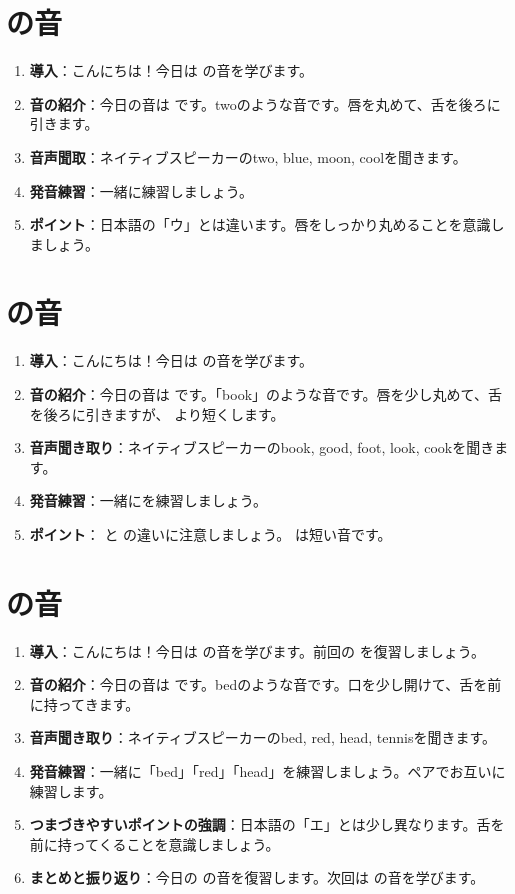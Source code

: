 \documentclass[book,jafontscale=0.9247]{jlreq}
\begin{document}
\section{ の音}
\begin{enumerate}
    \item \textbf{導入}：こんにちは！今日は  の音を学びます。
    \item \textbf{音の紹介}：今日の音は  です。twoのような音です。唇を丸めて、舌を後ろに引きます。
    \item \textbf{音声聞取}：ネイティブスピーカーのtwo, blue, moon, coolを聞きます。
    \item \textbf{発音練習}：一緒に練習しましょう。
    \item \textbf{ポイント}：日本語の「ウ」とは違います。唇をしっかり丸めることを意識しましょう。
\end{enumerate}
\section{\textipa{/\textupsilon /} の音}
\begin{enumerate}
    \item \textbf{導入}：こんにちは！今日は  の音を学びます。
    \item \textbf{音の紹介}：今日の音は \textipa{/\textupsilon /} です。「book」のような音です。唇を少し丸めて、舌を後ろに引きますが、 より短くします。
    \item \textbf{音声聞き取り}：ネイティブスピーカーのbook, good, foot, look, cookを聞きます。
    \item \textbf{発音練習}：一緒にを練習しましょう。
    \item \textbf{ポイント}： と \textipa{/\textupsilon/} の違いに注意しましょう。  は短い音です。
\end{enumerate}
\section{ の音}
\begin{enumerate}
    \item \textbf{導入}：こんにちは！今日は  の音を学びます。前回の  を復習しましょう。
    \item \textbf{音の紹介}：今日の音は  です。bedのような音です。口を少し開けて、舌を前に持ってきます。
    \item \textbf{音声聞き取り}：ネイティブスピーカーのbed, red, head, tennisを聞きます。
    \item \textbf{発音練習}：一緒に「bed」「red」「head」を練習しましょう。ペアでお互いに練習します。
    \item \textbf{つまづきやすいポイントの強調}：日本語の「エ」とは少し異なります。舌を前に持ってくることを意識しましょう。
    \item \textbf{まとめと振り返り}：今日の  の音を復習します。次回は  の音を学びます。
\end{enumerate}
\end{document}
